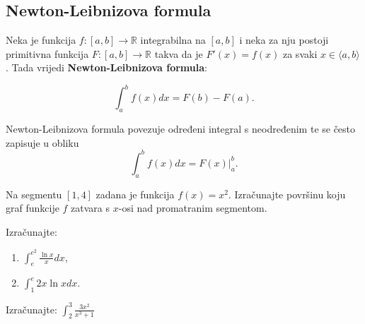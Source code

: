 \subsection{Newton-Leibnizova formula}

Neka je funkcija $f: [a,b] \to \mathbb{R}$ integrabilna na $[a,b]$ i neka za nju postoji primitivna funkcija $F: [a,b] \to \mathbb{R}$ takva da je $F'(x)=f(x)$ za svaki $x\in \langle a, b \rangle$. Tada vrijedi \textbf{Newton-Leibnizova formula}:

$$
  \int_a^b f(x)dx=F(b)-F(a).
$$

Newton-Leibnizova formula povezuje određeni integral s neodređenim te se često zapisuje u obliku
$$
  \int_a^b f(x)dx=F(x)\Big|_a^b.
$$

\begin{example}
    Na segmentu $[1,4]$ zadana je funkcija $f(x)=x^2$.
    Izračunajte površinu koju graf funkcije $f$ zatvara s $x$-osi nad promatranim segmentom.
\end{example}

\begin{example}
    Izračunajte:

    \begin{enumerate}
        \item $\displaystyle \int_e^{e^2} \frac{\ln x}{x} dx$,
        \item $\displaystyle \int_1^{e} 2x \ln x dx$.
    \end{enumerate}
\end{example}

\begin{example}
    Izračunajte: $\displaystyle \int_2^3 \frac{3x^2}{x^3+1}$
\end{example}
